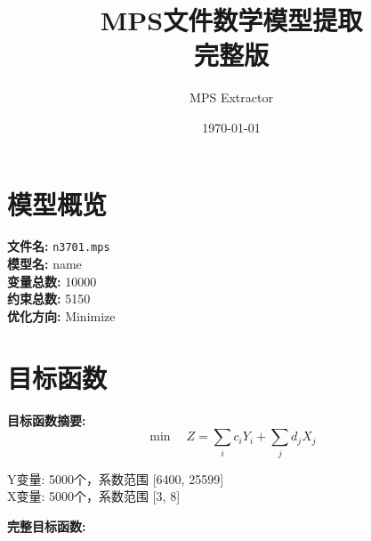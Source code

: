 \documentclass[a4paper,10pt]{article}
\title{MPS文件数学模型提取\\{\large 完整版}}
\author{MPS Extractor}
\date{\today}
\begin{document}
\maketitle
\tableofcontents
\newpage

\section{模型概览}

\textbf{文件名:} \texttt{n3701.mps} \\
\textbf{模型名:} name \\
\textbf{变量总数:} 10000 \\
\textbf{约束总数:} 5150 \\
\textbf{优化方向:} Minimize \\

\section{目标函数}

\textbf{目标函数摘要:}
\begin{equation}
\min \quad Z = \sum_{i} c_i Y_i + \sum_{j} d_j X_j
\end{equation}

Y变量: 5000个，系数范围 [6400, 25599] \\
X变量: 5000个，系数范围 [3, 8]

\textbf{完整目标函数:}
\end{document}
